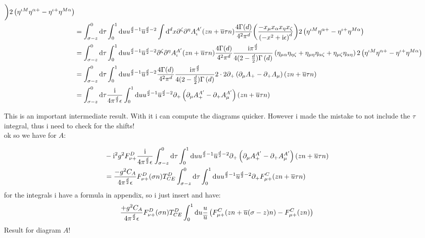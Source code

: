 \begin{align}
	\bigg)  2\left(\eta^{\iota M } \eta^{\alpha +}  - \eta^{\iota +} \eta^{M\alpha} \right)
	\\
	&=
	\int^{0}_{\sigma-z}\text{d} \tau\int _0^1 \text{d} u u^{\frac{d}{2}-1} \overline u ^{\frac{d}{2}-2}\int \text{d} ^d x  \partial^\zeta \partial^\eta A_\iota^{A'}(z n + \overline u \tau n) \frac{4\Gamma(d)}{4^2\pi^{d}}\bigg( \frac{ -x_\mu x_\alpha x_\eta x_\zeta}{\left(-x^2+\text{i} \epsilon\right)^{d}} 
	\bigg)  2\left(\eta^{\iota M } \eta^{\alpha +}  - \eta^{\iota +} \eta^{M\alpha} \right)
	\\
	&=
	\int^{0}_{\sigma-z}\text{d} \tau\int _0^1 \text{d} u u^{\frac{d}{2}-1} \overline u ^{\frac{d}{2}-2} \partial^\zeta \partial^\eta A_\iota^{A'}(z n + \overline u \tau n) \frac{4\Gamma(d)}{4^2\pi^{d}}\frac{\text{i} \pi^{\frac{d}{2}}}{4(2-\frac{d}{2})\Gamma\left(d\right)}\left(\eta_{\mu\alpha}\eta_{\eta \zeta} + \eta_{\mu \eta} \eta_{\alpha \zeta} +\eta_{\mu \zeta}\eta_{\alpha \eta}\right)  2\left(\eta^{\iota M } \eta^{\alpha +}  - \eta^{\iota +} \eta^{M\alpha} \right)
	\\
	&=
	\int^{0}_{\sigma-z} \text{d} \tau\int _0^1 \text{d} u u^{\frac{d}{2}-1} \overline u ^{\frac{d}{2}-2}  \frac{4\Gamma(d)}{4^2\pi^{d}}\frac{\text{i} \pi^{\frac{d}{2}}}{4(2-\frac{d}{2})\Gamma\left(d\right)}2\cdot 2 \partial_+ \left( \partial_\mu A_+ - \partial_+ A_\mu\right)(zn+\overline u \tau n)
	\\
	&=
	\int^{0}_{\sigma-z} \text{d} \tau\frac{\text{i}}{4\pi^{\frac{d}{2}}\epsilon}\int _0^1 \text{d} u u^{\frac{d}{2}-1} \overline u ^{\frac{d}{2}-2} \partial_+ \left( \partial_\mu A_+^{A'} - \partial_+ A_\mu^{A'}\right)(zn+\overline u \tau n)
\end{align}

This is an important intermediate result. 
With it i can compute the diagrams quicker.
However i made the mistake to not include the $\tau$ integral, thus i need to check for the shifts! \\
ok so we have for $A$:

\begin{align}
	&-\text{i}^2 g^2 F_{\nu +} ^D\frac{\text{i}}{4\pi^{\frac{d}{2}}\epsilon}\int ^{0}_{\sigma-z} \text{d} \tau \int _0^1 \text{d} u u^{\frac{d}{2}-1} \overline u ^{\frac{d}{2}-2} \partial_+ \left( \partial_\mu A_+^{A'} - \partial_+ A_\mu^{A'}\right)(zn+\overline u \tau n)
	\\
	&=
	\frac{-g^2C_A}{4\pi^{\frac{d}{2}}\epsilon}F_{\nu +} ^D(\sigma n) T^D_{CE}\int ^{0}_{\sigma-z} \text{d} \tau\int _0^1 \text{d} u u^{\frac{d}{2}-1} \overline u ^{\frac{d}{2}-2} \partial_+ F_{\mu +}^C (zn+\overline u \tau n)
\end{align}
for the integrals i have a formula in appendix, so i just insert and have:
\begin{align}
	\frac{+g^2C_A}{4\pi^{\frac{d}{2}}\epsilon}F_{\nu +} ^D(\sigma n) T^D_{CE}\int _0^1 \text{d} u \frac{u}{\overline u} \left(F_{\mu +}^C (zn+ \overline u(\sigma -z) n) - F_{\mu +}^C(zn)\right)
\end{align}
Result for diagram $A$!

